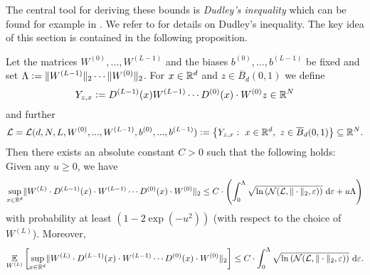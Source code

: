 The central tool for deriving these bounds is \emph{Dudley's inequality} which can be found for example in \cite[Theorems~5.25~and~5.29]{van2014probability}. We refer to  for details on Dudley's inequality. The key idea of this section is contained in the following proposition. 
\begin{proposition}\label{prop:key}
Let the matrices $W^{(0)}, ..., W^{(L-1)}$ and the biases $b^{(0)},..., b^{(L-1)}$ be fixed and set $\Lambda \mathrel{\mathop:}= \Vert W^{(L-1)} \Vert_2 \cdots \Vert W^{(0)} \Vert_2$. For $x \in \mathbb{R}^d$ and $z \in \overline{B}_d(0,1)$ we define
\begin{equation*}
Y_{z,x} \mathrel{\mathop:}= D^{(L-1)}(x) W^{(L-1)}\cdots D^{(0)}(x) \cdot W^{(0)}z \in \mathbb{R}^N
\end{equation*}
and further
\begin{equation*}
\mathcal{L} = \mathcal{L}(d,N,L,W^{(0)}, ..., W^{(L-1)}, b^{(0)},..., b^{(L-1)})\mathrel{\mathop:}= \left\{ Y_{z,x}: \ x \in \mathbb{R}^d, \ z \in \overline{B}_d(0,1)\right\} \subseteq \mathbb{R}^N. 
\end{equation*}
Then there exists an absolute constant $C>0$ such that the following holds: Given any $u \geq 0$, we have
\begin{equation*}
\underset{x \in \mathbb{R}^d}{\sup} \Vert W^{(L)} \cdot D^{(L-1)}(x)\cdot W^{(L-1)} \cdots D^{(0)}(x) \cdot W^{(0)}\Vert_2 \leq  C \cdot \left( \int_0^{\Lambda} \sqrt{\ln \left(\mathcal{N}(\mathcal{L}, \Vert \cdot \Vert_2, \varepsilon)\right)} \ \mathrm{d} \varepsilon + u \Lambda \right)
\end{equation*}
with probability at least $(1 - 2\exp(-u^2))$ (with respect to the choice of $W^{(L)}$). Moreover, 
\begin{equation*}
\underset{W^{(L)}}{\mathbb{E}} \left[ \underset{x \in \mathbb{R}^d}{\sup} \Vert W^{(L)} \cdot D^{(L-1)}(x) \cdot W^{(L-1)}\cdots D^{(0)}(x)\cdot W^{(0)}\Vert_2\right] \leq C \cdot \int_0^{\Lambda}  \sqrt{\ln \left(\mathcal{N}(\mathcal{L}, \Vert \cdot \Vert_2, \varepsilon)\right)} \ \mathrm{d} \varepsilon.
\end{equation*}
\end{proposition}
